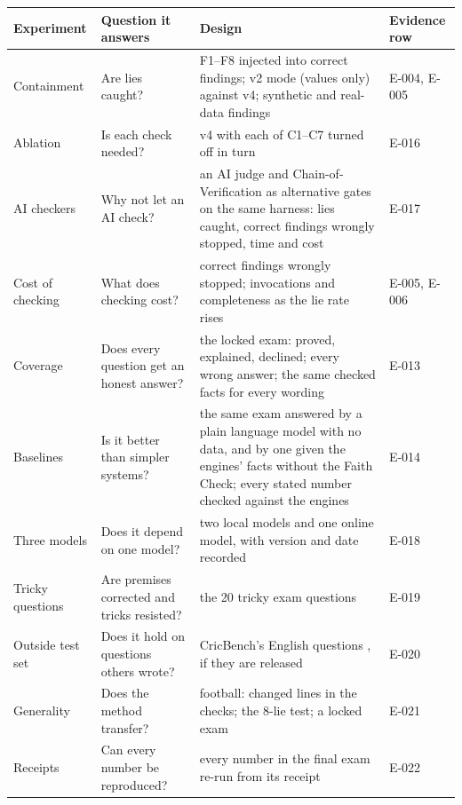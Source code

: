 \documentclass[11pt,a4paper]{article}
\begin{document}
\begin{table}[htbp]
\centering
\footnotesize
\renewcommand{\arraystretch}{1.22}
\begin{tabular}{@{}>{\raggedright\arraybackslash}p{2.7cm}
                  >{\raggedright\arraybackslash}p{3.6cm}
                  >{\raggedright\arraybackslash}p{7.2cm}
                  >{\raggedright\arraybackslash}p{1.6cm}@{}}
\toprule
\textbf{Experiment} & \textbf{Question it answers} & \textbf{Design} & \textbf{Evidence row} \\
\midrule
Containment & Are lies caught? & F1--F8 injected into correct findings; v2 mode (values only) against v4; synthetic and real-data findings & E-004, E-005 \\
Ablation & Is each check needed? & v4 with each of C1--C7 turned off in turn & E-016 \\
AI checkers & Why not let an AI check? & an AI judge \cite{llmjudge} and Chain-of-Verification \cite{cove} as alternative gates on the same harness: lies caught, correct findings wrongly stopped, time and cost & E-017 \\
Cost of checking & What does checking cost? & correct findings wrongly stopped; invocations and completeness as the lie rate rises & E-005, E-006 \\
Coverage & Does every question get an honest answer? & the locked exam: proved, explained, declined; every wrong answer; the same checked facts for every wording & E-013 \\
Baselines & Is it better than simpler systems? & the same exam answered by a plain language model with no data, and by one given the engines' facts without the Faith Check; every stated number checked against the engines & E-014 \\
Three models & Does it depend on one model? & two local models and one online model, with version and date recorded & E-018 \\
Tricky questions & Are premises corrected and tricks resisted? & the 20 tricky exam questions & E-019 \\
Outside test set & Does it hold on questions others wrote? & CricBench's English questions \cite{cricbench}, if they are released & E-020 \\
Generality & Does the method transfer? & football: changed lines in the checks; the 8-lie test; a locked exam & E-021 \\
Receipts & Can every number be reproduced? & every number in the final exam re-run from its receipt & E-022 \\

\end{tabular}
\end{table}
\end{document}
